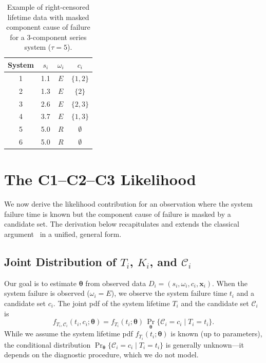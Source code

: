 \documentclass[11pt]{article}
\theoremstyle{definition}
\theoremstyle{plain}
\renewcommand{\v}[1]{\boldsymbol{#1}}
\newcommand{\btheta}{\v{\theta}}
\begin{document}
\begin{table}[ht]
\centering
\caption{Example of right-censored lifetime data with masked component
cause of failure for a 3-component series system ($\tau = 5$).}
\label{tab:masked-data-example}
\begin{tabular}{cccc}
\toprule
System & $s_i$ & $\omega_i$ & $c_i$ \\
\midrule
1 & 1.1 & $E$ & $\{1, 2\}$ \\
2 & 1.3 & $E$ & $\{2\}$ \\
3 & 2.6 & $E$ & $\{2, 3\}$ \\
4 & 3.7 & $E$ & $\{1, 3\}$ \\
5 & 5.0 & $R$ & $\emptyset$ \\
6 & 5.0 & $R$ & $\emptyset$ \\
\bottomrule
\end{tabular}
\end{table}


\section{The C1--C2--C3 Likelihood}
\label{sec:c1c2c3}

We now derive the likelihood contribution for an observation where the
system failure time is known but the component cause of failure is masked
by a candidate set.
The derivation below recapitulates and extends the classical
argument~\citep{miyakawa1984,Usher-1988} in a unified,
general form.

\subsection{Joint Distribution of \texorpdfstring{$T_i$, $K_i$, and $\mathcal{C}_i$}{Ti, Ki, and Ci}}
\label{sec:joint-tkc}

Our goal is to estimate $\btheta$ from observed data $D_i = (s_i, \omega_i, c_i, \v{x}_i)$.
When the system failure is observed ($\omega_i = E$), we observe the system
failure time $t_i$ and a candidate set $c_i$.
The joint pdf of the system lifetime $T_i$ and the candidate set
$\mathcal{C}_i$ is
\begin{equation}
\label{eq:joint-tc}
    f_{T_i, \mathcal{C}_i}(t_i, c_i; \btheta)
    = f_{T_i}(t_i; \btheta) \,
        \Pr_{\!\btheta}\{\mathcal{C}_i = c_i \mid T_i = t_i\}.
\end{equation}
While we assume the system lifetime pdf $f_{T_i}(t_i; \btheta)$ is known
(up to parameters), the conditional distribution
$\Pr_{\!\btheta}\{\mathcal{C}_i = c_i \mid T_i = t_i\}$ is generally
unknown---it depends on the diagnostic procedure, which we do not model.
\end{document}
